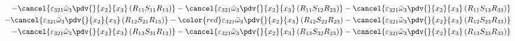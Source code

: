 \begin{equation}
\begin{split}
		-\cancel{\varepsilon_{321}\tilde{\omega}_{3}\pdv{}{x_{2}}{x_{3}}\left(R_{11}S_{11}R_{13}\right)}
		-\cancel{\varepsilon_{321}\tilde{\omega}_{3}\pdv{}{x_{2}}{x_{3}}\left(R_{11}S_{12}R_{23}\right)}
		-\cancel{\varepsilon_{321}\tilde{\omega}_{3}\pdv{}{x_{2}}{x_{3}}\left(R_{11}S_{13}R_{33}\right)}\\
		-\cancel{\varepsilon_{321}\tilde{\omega}_{3}\pdv{}{x_{2}}{x_{3}}\left(R_{12}S_{21}R_{13}\right)}
		-{\color{red}\varepsilon_{321}\tilde{\omega}_{3}\pdv{}{x_{2}}{x_{3}}\left(R_{12}S_{22}R_{23}\right)}
		-\cancel{\varepsilon_{321}\tilde{\omega}_{3}\pdv{}{x_{2}}{x_{3}}\left(R_{12}S_{23}R_{33}\right)}\\
		-\cancel{\varepsilon_{321}\tilde{\omega}_{3}\pdv{}{x_{2}}{x_{3}}\left(R_{13}S_{31}R_{13}\right)}
		-\cancel{\varepsilon_{321}\tilde{\omega}_{3}\pdv{}{x_{2}}{x_{3}}\left(R_{13}S_{32}R_{23}\right)}
		-\cancel{\varepsilon_{321}\tilde{\omega}_{3}\pdv{}{x_{2}}{x_{3}}\left(R_{13}S_{33}R_{33}\right)}\\
	\end{split}
\end{equation}
